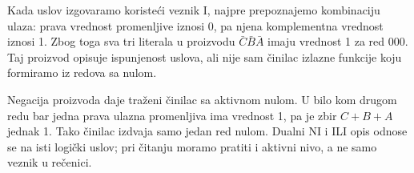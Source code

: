 
Kada uslov izgovaramo koristeći veznik I, najpre prepoznajemo kombinaciju ulaza: prava vrednost promenljive iznosi 0, pa njena komplementna vrednost iznosi 1. Zbog toga sva tri literala u proizvodu \(\bar C\bar B\bar A\) imaju vrednost 1 za red 000. Taj proizvod opisuje ispunjenost uslova, ali nije sam činilac izlazne funkcije koju formiramo iz redova sa nulom.

Negacija proizvoda daje traženi činilac sa aktivnom nulom. U bilo kom drugom redu bar jedna prava ulazna promenljiva ima vrednost 1, pa je zbir \(C+B+A\) jednak 1. Tako činilac izdvaja samo jedan red nulom. Dualni NI i ILI opis odnose se na isti logički uslov; pri čitanju moramo pratiti i aktivni nivo, a ne samo veznik u rečenici.
